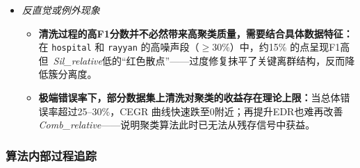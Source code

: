 \documentclass[10pt]{article} %
\numberwithin{equation}{section}
\begin{document}
\begin{enumerate}[label=(\alph*)]
\begin{itemize}
    \vspace{0.2em}
    \item \emph{反直觉或例外现象}\\[-0.2em]
    \begin{itemize}
        \item \textbf{清洗过程的高F1分数并不必然带来高聚类质量，需要结合具体数据特征：}在 \texttt{hospital} 和 \texttt{rayyan} 的高噪声段（$\ge30\%$）中，约15\% 的点呈现F1高但 \textit{Sil\_relative}低的“红色散点”——过度修复抹平了关键离群结构，反而降低簇分离度。  
        \item \textbf{极端错误率下，部分数据集上清洗对聚类的收益存在理论上限：}当总体错误率超过25–30\%，CEGR 曲线快速跌至0附近；再提升EDR也难再改善 \textit{Comb\_relative}——说明聚类算法此时已无法从残存信号中获益。   
    \end{itemize}
\end{itemize}
\end{enumerate}

\subsubsection{算法内部过程追踪}
\label{subsec:internal_tracking}
\end{document}
